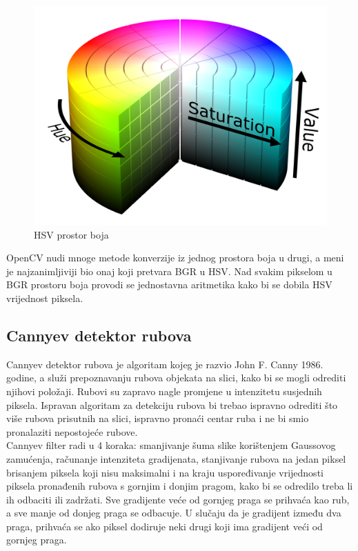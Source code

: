 \documentclass[times, utf8, zavrsni, numeric]{fer}
\begin{document}
\begin{figure}[h]
	\includegraphics[scale=0.11]{hsv.png}
	\centering
	\caption{HSV prostor boja\cite{hsv}}
	\label{fig:hsv}
\end{figure}

OpenCV nudi mnoge metode konverzije iz jednog prostora boja u drugi, a meni je najzanimljiviji bio onaj koji pretvara BGR u HSV. Nad svakim pikselom u BGR prostoru boja provodi se jednostavna aritmetika kako bi se dobila HSV vrijednost piksela.

\subsection{Cannyev detektor rubova}
Cannyev detektor rubova je algoritam kojeg je razvio John F. Canny 1986. godine, a služi prepoznavanju rubova objekata na slici, kako bi se mogli odrediti njihovi položaji. Rubovi su zapravo nagle promjene u intenzitetu susjednih piksela. Ispravan algoritam za detekciju rubova bi trebao ispravno odrediti što više rubova prisutnih na slici, ispravno pronaći centar ruba i ne bi smio pronalaziti nepostojeće rubove\cite{canny1}.\\

Cannyev filter radi u 4 koraka: smanjivanje šuma slike korištenjem Gaussovog zamućenja, računanje intenziteta gradijenata, stanjivanje rubova na jedan piksel brisanjem piksela koji nisu maksimalni i na kraju uspoređivanje vrijednosti piksela pronađenih rubova s gornjim i donjim pragom, kako bi se odredilo treba li ih odbaciti ili zadržati. Sve gradijente veće od gornjeg praga se prihvaća kao rub, a sve manje od donjeg praga se odbacuje. U slučaju da je gradijent između dva praga, prihvaća se ako piksel dodiruje neki drugi koji ima gradijent veći od gornjeg praga.\\
\end{document}

